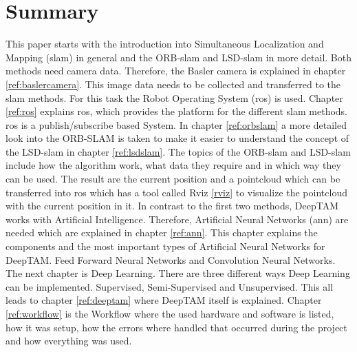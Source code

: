 

\chapter*{Summary}

This paper starts with the introduction into Simultaneous Localization and Mapping (\gls{slam}) in general and the ORB-\gls{slam} and LSD-\gls{slam} in more detail. \newline
Both methods need camera data. Therefore, the Basler camera is explained in chapter \ref{ref:baslercamera}. This image data needs to be collected and transferred to the \gls{slam} methods. For this task the Robot Operating System (\gls{ros}) is used. Chapter \ref{ref:ros} explains \gls{ros}, which provides the platform for the different \gls{slam} methods. \gls{ros} is a publish/subscribe based System. In chapter \ref{ref:orbslam} a more detailed look into the ORB-SLAM is taken to make it easier to understand the concept of the LSD-\gls{slam} in chapter \ref{ref:lsdslam}. The topics of the ORB-\gls{slam} and LSD-\gls{slam} include how the algorithm work, what data they require and in which way they can be used. The result are the current position and a pointcloud which can be transferred into \gls{ros} which has a tool called Rviz \ref{rviz} to visualize the pointcloud with the current position in it. \newline
In contrast to the first two methods, DeepTAM works with Artificial Intelligence. Therefore, Artificial Neural Networks (\gls{ann}) are needed which are explained in chapter \ref{ref:ann}. This chapter explains the components and the most important types of Artificial Neural Networks for DeepTAM. Feed Forward Neural Networks and Convolution Neural Networks. The next chapter is Deep Learning. There are three different ways Deep Learning can be implemented. Supervised, Semi-Supervised and Unsupervised. This all leads to chapter \ref{ref:deeptam} where DeepTAM itself is explained. \newline
Chapter \ref{ref:workflow} is the Workflow where the used hardware and software is listed, how it was setup, how the errors where handled that occurred during the project and how everything was used.
